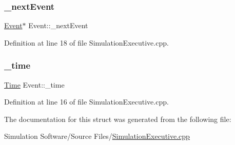\subsubsection{\texorpdfstring{\+\_\+next\+Event}{\_nextEvent}}
{\footnotesize\ttfamily \hyperlink{struct_event}{Event}$\ast$ Event\+::\+\_\+next\+Event}



Definition at line 18 of file Simulation\+Executive.\+cpp.

\mbox{\label{struct_event_a7077d3af8bbf3d40e3c4570cc4675512}} 
\subsubsection{\texorpdfstring{\+\_\+time}{\_time}}
{\footnotesize\ttfamily \hyperlink{_simulation_executive_8h_ac2d3e0ba793497bcca555c7c2cf64ff3}{Time} Event\+::\+\_\+time}



Definition at line 16 of file Simulation\+Executive.\+cpp.



The documentation for this struct was generated from the following file\+:\begin{DoxyCompactItemize}
\item 
Simulation Software/\+Source Files/\hyperlink{_simulation_executive_8cpp}{Simulation\+Executive.\+cpp}\end{DoxyCompactItemize}
